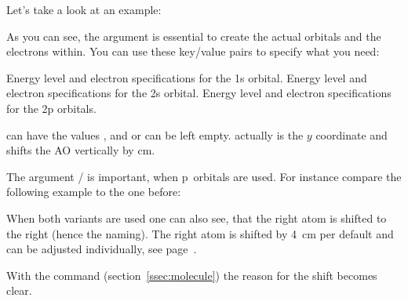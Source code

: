 \documentclass[load-preamble+]{cnltx-doc}
\begin{document}
Let's take a look at an example:
\begin{example}
  \begin{modiagram}
  \end{modiagram}
\end{example}

As you can see, the argument  is essential to create the actual
orbitals and the electrons within. You can use these key/value pairs to specify
what you need:
\begin{options}
     Energy level and electron specifications for the 1s orbital.
    Energy level and electron specifications for the 2s orbital.
    Energy level and electron specifications for the 2p orbitals.
\end{options}
 can have the values ,  and  or
can be left empty.  actually is the $y$ coordinate and shifts
the \ac{AO} vertically by  \si{\centi\metre}.

The argument / is important, when p~orbitals are used.
For instance compare the following example to the one before:
\begin{example}
  \begin{modiagram}
  \end{modiagram}
\end{example}

When both variants are used one can also see, that the right atom is shifted to
the right (hence the naming). The right atom is shifted by \SI{4}{\centi\metre}
per default and can be adjusted individually, see page~\pageref{option:distance}.
\begin{example}
  \begin{modiagram}
  \end{modiagram}
\end{example}
With the command  (section~\ref{ssec:molecule}) the reason for the
shift becomes clear.
\end{document}
